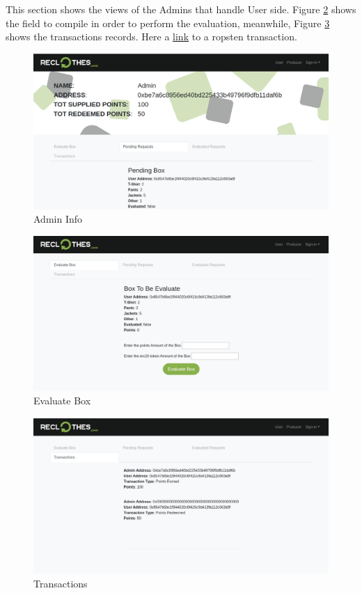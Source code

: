 This section shows the views of the Admins that handle User side. Figure \ref{fig:evaluate_box} shows the field 
to compile in order to perform the evaluation, meanwhile, Figure \ref{fig:admin-tx} shows the transactions records.
Here a \href{https://ropsten.etherscan.io/tx/0x6688afff4f6adb7e334b87a2f078608ba11b0e0d884f54b52eac1cdde100a12e}{link} to a ropsten transaction.

\begin{figure}[h!]
    \centering
    \includegraphics[totalheight=7.5cm]{img/dapp/admin-info.png}
    \caption{Admin Info}
    \label{fig:admin_info}
\end{figure}

\begin{figure}[h!]
    \centering
    \includegraphics[totalheight=7.5cm]{img/dapp/admin-evaluate.png}
    \caption{Evaluate Box}
    \label{fig:evaluate_box}
\end{figure}

\begin{figure}[h!]
    \centering
    \includegraphics[totalheight=7.5cm]{img/dapp/admin-tx.png}
    \caption{Transactions}
    \label{fig:admin-tx}
\end{figure}

